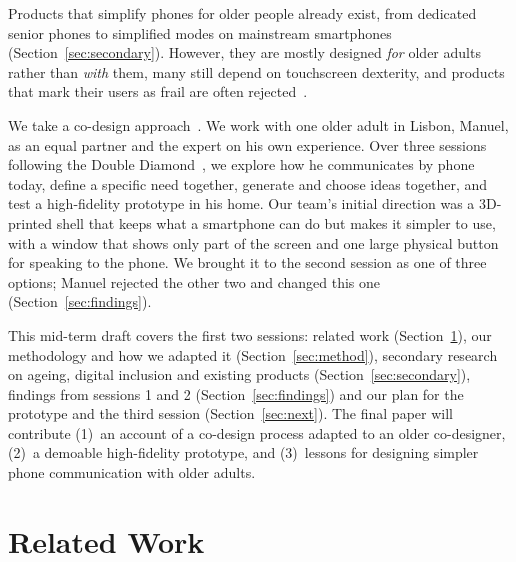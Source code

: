 \documentclass[acmtog,nonacm]{acmart}
\begin{document}
Products that simplify phones for older people already exist, from dedicated senior phones to simplified modes on mainstream smartphones (Section~\ref{sec:secondary}). However, they are mostly designed \emph{for} older adults rather than \emph{with} them, many still depend on touchscreen dexterity, and products that mark their users as frail are often rejected~\cite{shinohara2011shadow, pullin2009design}.

We take a co-design approach~\cite{sanders2008cocreation}. We work with one older adult in Lisbon, Manuel, as an equal partner and the expert on his own experience. Over three sessions following the Double Diamond~\cite{designcouncil2004double}, we explore how he communicates by phone today, define a specific need together, generate and choose ideas together, and test a high-fidelity prototype in his home. Our team's initial direction was a 3D-printed shell that keeps what a smartphone can do but makes it simpler to use, with a window that shows only part of the screen and one large physical button for speaking to the phone. We brought it to the second session as one of three options; Manuel rejected the other two and changed this one (Section~\ref{sec:findings}).

This mid-term draft covers the first two sessions: related work (Section~\ref{sec:related}), our methodology and how we adapted it (Section~\ref{sec:method}), secondary research on ageing, digital inclusion and existing products (Section~\ref{sec:secondary}), findings from sessions 1 and 2 (Section~\ref{sec:findings}) and our plan for the prototype and the third session (Section~\ref{sec:next}). The final paper will contribute (1)~an account of a co-design process adapted to an older co-designer, (2)~a demoable high-fidelity prototype, and (3)~lessons for designing simpler phone communication with older adults.

\section{Related Work}\label{sec:related}
\end{document}
